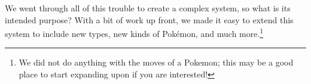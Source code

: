 We went through all of this trouble to create a complex system, so what is its intended purpose? With a bit of work up front, we made it easy to extend this system to include new types, new kinds of Pok\'emon, and much more.\footnote{We did not do anything with the moves of a Pokemon; this may be a good place to start expanding upon if you are interested!}
